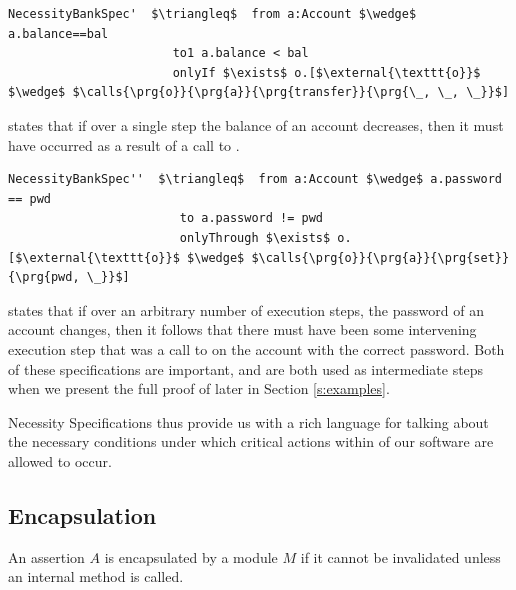 \begin{lstlisting}[language = Chainmail, mathescape=true, frame=lines]
NecessityBankSpec'  $\triangleq$  from a:Account $\wedge$ a.balance==bal
                       to1 a.balance < bal
                       onlyIf $\exists$ o.[$\external{\texttt{o}}$ $\wedge$ $\calls{\prg{o}}{\prg{a}}{\prg{transfer}}{\prg{\_, \_, \_}}$]
\end{lstlisting}
 
 states that if over a single step the balance of an account decreases, then it must have occurred as 
a result of a call to .
 
\begin{lstlisting}[language = Chainmail, mathescape=true, frame=lines]
NecessityBankSpec''  $\triangleq$  from a:Account $\wedge$ a.password == pwd
                        to a.password != pwd
                        onlyThrough $\exists$ o.[$\external{\texttt{o}}$ $\wedge$ $\calls{\prg{o}}{\prg{a}}{\prg{set}}{\prg{pwd, \_}}$]
\end{lstlisting}
 
 states that if over an arbitrary number of execution steps, the password of an account changes,
then it follows that there must have been some intervening execution step that was a call to  on the account 
with the correct password. Both of these specifications are important, and are both used as intermediate steps
when we present the full proof of  later in Section \ref{s:examples}.

Necessity Specifications thus provide us with a rich language for talking about the necessary conditions
under which critical actions within of our software are allowed to occur.
 




\subsection{Encapsulation}
An assertion $A$ is encapsulated by a module $M$ if it cannot be invalidated unless an
internal method is called. 

